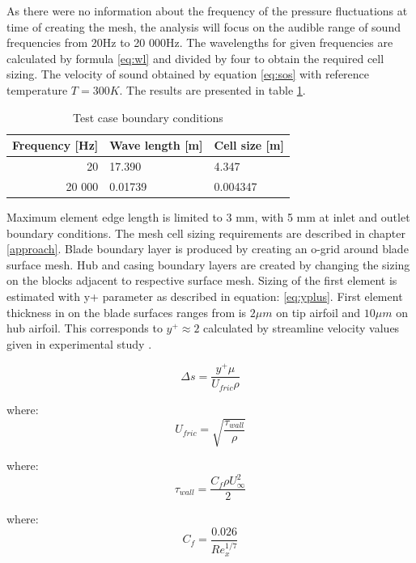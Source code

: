 As there were no information about the frequency of the pressure fluctuations at time of creating the mesh, the analysis will focus on the audible range of sound frequencies from 20Hz to 20 000Hz. The wavelengths for given frequencies are calculated by formula \ref{eq:wl} and divided by four to obtain the required cell sizing. The velocity of sound obtained by equation \ref{eq:sos} with reference temperature $T = 300K$. The results are presented in table \ref{tab:meshsize}.

\begin{table}[htb!]
\centering
\caption{Test case boundary conditions} \label{tab:meshsize}
\begin{tabular}{@{}rll@{}}
\toprule
Frequency [Hz] & Wave length [m] & Cell size [m] \\ \midrule
20 & 17.390 & 4.347  \\
20 000 & 0.01739 & 0.004347 \\
\bottomrule
\end{tabular}
\end{table}

Maximum element edge length is limited to 3 mm, with 5 mm at inlet and outlet boundary conditions. The mesh cell sizing requirements are described in chapter \ref{approach}.  Blade boundary layer is produced by creating an o-grid around blade surface mesh. Hub and casing boundary layers are created by changing the sizing on the blocks adjacent to respective surface mesh. Sizing of the first element is estimated with y+ parameter as described in equation: \ref{eq:yplus}. First element thickness in on the blade surfaces ranges from is $2 \mu m$ on tip airfoil and $10 \mu m$ on hub airfoil. This corresponds to $y^{+} \approx 2$ calculated by streamline velocity values given in experimental study \citep{r67laser}.

\begin{equation} \label{eq:yplus}
\Delta s = \frac{y^{+} \mu}{U_{fric} \rho}
\end{equation}

\noindent where:
\begin{equation}
U_{fric} = \sqrt{\frac{\tau_{wall}}{\rho}}
\end{equation}

\noindent where:
\begin{equation}
\tau_{wall} = \frac{C_f \rho U_{\infty}^{2}}{2}
\end{equation}

\noindent where:
\begin{equation}
C_f = \frac{0.026}{Re_{x}^{1/7}}
\end{equation}

